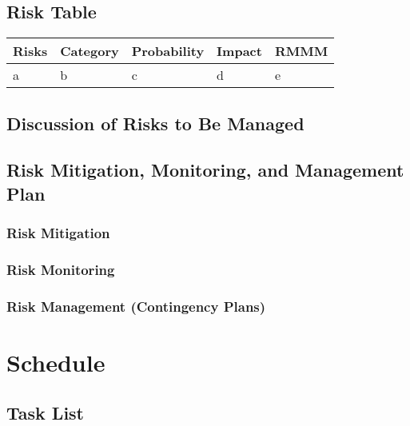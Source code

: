 \documentclass[english,12pt]{article}
\begin{document}
\subsection{Risk Table}
\begin{table}[H]
  \begin{center}
    \begin{tabular}[c]{|l|l|l|l|l|}
      \hline
      \multicolumn{1}{|c|}{\textbf{Risks}} & 
      \multicolumn{1}{|c|}{\textbf{Category}} & 
      \multicolumn{1}{|c|}{\textbf{Probability}} &
      \multicolumn{1}{|c|}{\textbf{Impact}} &
      \multicolumn{1}{|c|}{\textbf{RMMM}} \\
      \hline
      a & b & c & d & e\\
      \hline
    \end{tabular}
  \end{center}
\end{table}

\subsection{Discussion of Risks to Be Managed}

\subsection{Risk Mitigation, Monitoring, and Management Plan}

\subsubsection{Risk Mitigation}

\subsubsection{Risk Monitoring}

\subsubsection{Risk Management (Contingency Plans)}

\section{Schedule}

\subsection{Task List}
\end{document}
